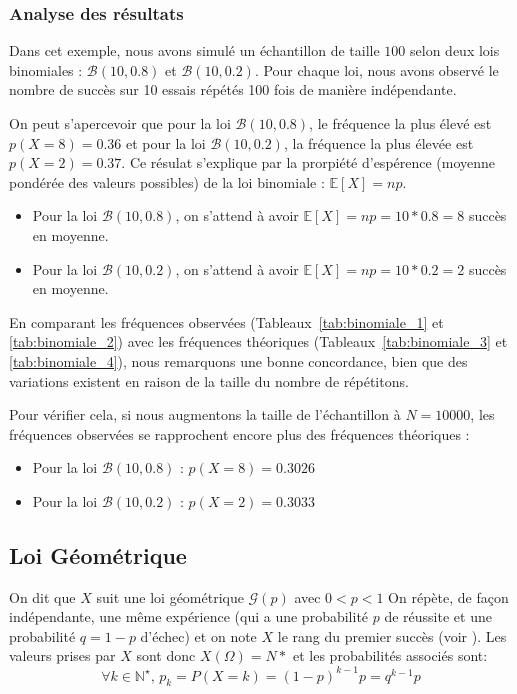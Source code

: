     \subsubsection{Analyse des résultats}
    Dans cet exemple, nous avons simulé un échantillon de taille $100$ selon deux lois binomiales : $\mathcal B(10,0.8)$ et $\mathcal B(10,0.2)$. Pour chaque loi, nous avons observé le nombre de succès sur 10 essais répétés 100 fois de manière indépendante.
    
    On peut s'apercevoir que pour la loi $\mathcal B(10,0.8)$, le fréquence la plus élevé est $p(X=8)=0.36$ et pour la loi $\mathcal B(10,0.2)$, la fréquence la plus élevée est $p(X=2)=0.37$. 
    Ce résulat s'explique par la prorpiété d'espérence (moyenne pondérée des valeurs possibles) de la loi binomiale : $\mathbb E[X]=np$.
    \begin{itemize}
      \item Pour la loi $\mathcal B(10,0.8)$, on s'attend à avoir $\mathbb E[X]=np=10*0.8=8$ succès en moyenne.
      \item Pour la loi $\mathcal B(10,0.2)$, on s'attend à avoir $\mathbb E[X]=np=10*0.2=2$ succès en moyenne.
    \end{itemize}

    En comparant les fréquences observées (Tableaux~\ref{tab:binomiale_1} et \ref{tab:binomiale_2}) avec les fréquences théoriques (Tableaux~\ref{tab:binomiale_3} et \ref{tab:binomiale_4}), nous remarquons une bonne concordance, bien que des variations existent en raison de la taille du nombre de répétitons.

    Pour vérifier cela, si nous augmentons la taille de l'échantillon à $N=10000$, les fréquences observées se rapprochent encore plus des fréquences théoriques :
    \begin{itemize}
      \item Pour la loi $\mathcal B(10,0.8)$ : $p(X=8)=0.3026$
      \item Pour la loi $\mathcal B(10,0.2)$ : $p(X=2)=0.3033$
    \end{itemize}


    \subsection{Loi Géométrique}  
      On dit que $X$ suit une loi géométrique $\mathcal G(p)$ avec $ 0 < p < 1$
      On répète, de façon indépendante, une même expérience (qui a une probabilité $p$ de réussite et une probabilité $q=1-p$ d’échec) et on note $X$ le rang du premier succès (voir \cite{geometriclaw}).
      Les valeurs prises par $X$ sont donc $X(\Omega) = N*$ et les probabilités associés sont:
      \begin{equation}
        \forall k\in\mathbb N^\star,\, p_k=P(X=k) = (1-p)^{k-1}p = q^{k-1}p
        \label{eq:loi_geometrique}
      \end{equation}

